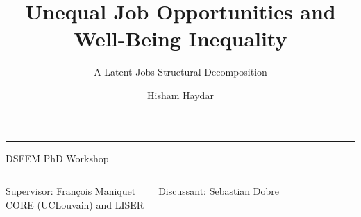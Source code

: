\documentclass[10pt,aspectratio=169]{beamer}
\title{Unequal Job Opportunities and Well-Being Inequality}
\subtitle{A Latent-Jobs Structural Decomposition}
\author{Hisham Haydar}
\institute{University of Luxembourg \& LISER}
\date{}
\begin{document}
\begin{frame}
\vfill
{\Large\bfseries\inserttitle\par}
\vspace{0.4em}
{\large\insertsubtitle\par}
\vspace{0.9em}
{\color{deepred}\rule{0.80\textwidth}{1pt}}\par
\vspace{0.9em}
\begin{center}
{\Large\insertauthor\par}
\vspace{0.3em}
{\normalsize\insertinstitute\par}
\vspace{0.6em}
{\small DSFEM PhD Workshop\par}
\end{center}

\vspace{0.6em}

\begin{columns}[T,onlytextwidth]
   \vspace{0.25em}
  {\footnotesize Supervisor: Fran\c{c}ois Maniquet\\[2pt]
  CORE (UCLouvain) and LISER\par}

  \begin{flushright}
    {\small Discussant: Sebastian Dobre\par}
  \end{flushright}
\end{columns}

\end{frame}


\end{document}

